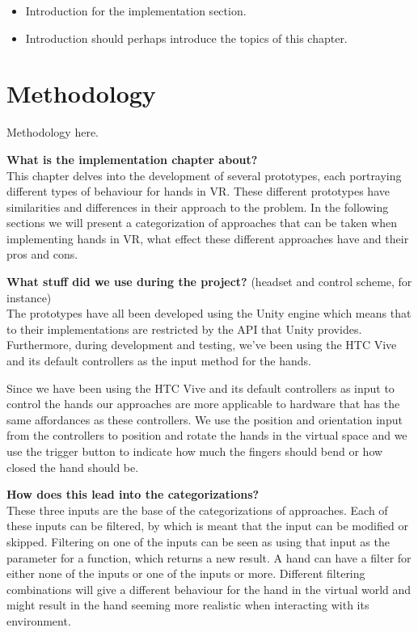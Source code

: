 \begin{itemize}
\item Introduction for the implementation section.
\item Introduction should perhaps introduce the topics of this chapter.
\end{itemize}

\section{Methodology}
\label{sec:methodology}
Methodology here.

\textbf{What is the implementation chapter about?}\\
This chapter delves into the development of several prototypes, each portraying different types of behaviour for hands in VR. These different prototypes have similarities and differences in their approach to the problem. In the following sections we will present a categorization of approaches that can be taken when implementing hands in VR, what effect these different approaches have and their pros and cons.

\textbf{What stuff did we use during the project?} (headset and control scheme, for instance)\\
The prototypes have all been developed using the Unity engine which means that to their implementations are restricted by the API that Unity provides. Furthermore, during development and testing, we’ve been using the HTC Vive and its default controllers as the input method for the hands.

Since we have been using the HTC Vive and its default controllers as input to control the hands our approaches are more applicable to hardware that has the same affordances as these controllers. We use the position and orientation input from the controllers to position and rotate the hands in the virtual space and we use the trigger button to indicate how much the fingers should bend or how closed the hand should be.


\textbf{How does this lead into the categorizations?}\\
These three inputs are the base of the categorizations of approaches. Each of these inputs can be filtered, by which is meant that the input can be modified or skipped. Filtering on one of the inputs can be seen as using that input as the parameter for a function, which returns a new result. A hand can have a filter for either none of the inputs or one of the inputs or more. Different filtering combinations will give a different behaviour for the hand in the virtual world and might result in the hand seeming more realistic when interacting with its environment.

